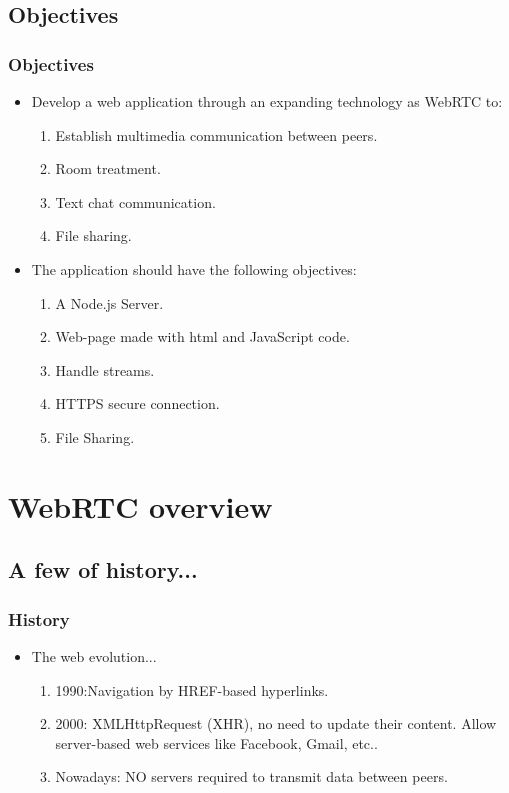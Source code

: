 \subsection{Objectives}
\begin{frame}[fragile]\frametitle{Objectives}
\begin{itemize}

\item Develop a web application through an expanding technology as WebRTC to:
  \begin{enumerate}
  \item Establish multimedia communication between peers.
  \item Room treatment.
  \item Text chat communication.
  \item File sharing.
  \end{enumerate}
  
\item The application should have the following objectives:%

  \begin{enumerate}
  \item A Node.js Server.
  \item Web-page made with html and JavaScript code.
  \item Handle streams.
  \item HTTPS secure connection. %
  \item File Sharing.
  \end{enumerate}
\end{itemize}
\end{frame}

\section{WebRTC overview}
\subsection{A few of history...}
\begin{frame}[fragile]\frametitle{History}
\begin{itemize}

\item The web evolution...
  \begin{enumerate}
  \item 1990:Navigation by HREF-based hyperlinks.
  \item 2000: XMLHttpRequest (XHR), no need to update their content. Allow server-based web services like Facebook, Gmail, etc..
  \item Nowadays: NO servers required to transmit data between peers.
  \end{enumerate}
\end{itemize}
\end{frame}
\clearpage


